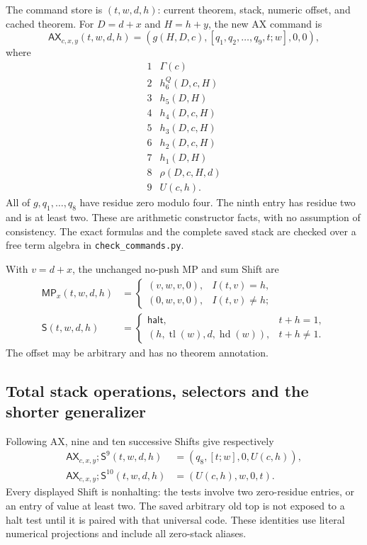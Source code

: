 The command store is $(t,w,d,h)$: current theorem, stack, numeric offset,
and cached theorem. For $D=d+x$ and $H=h+y$, the new AX command is
\begin{equation}\label{eq:g-ax}
 \mathsf{AX}_{c,x,y}(t,w,d,h)
    =(g(H,D,c),[q_1,q_2,\ldots,q_9,t;w],0,0),
\end{equation}
where
\[
\begin{array}{c|l}
1&\Gamma(c)\\2&h_6^Q(D,c,H)\\3&h_5(D,H)\\4&h_4(D,c,H)\\
5&h_3(D,c,H)\\6&h_2(D,c,H)\\7&h_1(D,H)\\
8&\rho(D,c,H,d)\\9&U(c,h).
\end{array}
\]
All of $g,q_1,\ldots,q_8$ have residue zero modulo four. The ninth entry
has residue two and is at least two. These are arithmetic constructor
facts, with no assumption of consistency. The exact formulas and the
complete saved stack are checked over a free term algebra in
\texttt{check\_commands.py}.

With $v=d+x$, the unchanged no-push MP and sum Shift are
\begin{align*}
 \mathsf{MP}_x(t,w,d,h)&=
 \begin{cases}(v,w,v,0),&I(t,v)=h,\\(0,w,v,0),&I(t,v)\ne h;\end{cases}\\
 \mathsf S(t,w,d,h)&=
 \begin{cases}\mathsf{halt},&t+h=1,\\
 (h,\operatorname{tl}(w),d,\operatorname{hd}(w)),&t+h\ne1.
 \end{cases}
\end{align*}
The offset may be arbitrary and has no theorem annotation.

\subsection{Total stack operations, selectors and the shorter generalizer}

Following AX, nine and ten successive Shifts give respectively
\begin{align*}
 \mathsf{AX}_{c,x,y};\mathsf S^9(t,w,d,h)
    &=(q_8,[t;w],0,U(c,h)),\\
 \mathsf{AX}_{c,x,y};\mathsf S^{10}(t,w,d,h)
    &=(U(c,h),w,0,t).
\end{align*}
Every displayed Shift is nonhalting: the tests involve two zero-residue
entries, or an entry of value at least two. The saved arbitrary old top
is not exposed to a halt test until it is paired with that universal code.
These identities use literal numerical projections and include all
zero-stack aliases.

